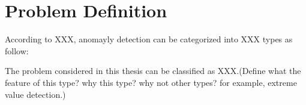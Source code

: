 \section{Problem Definition}
According to XXX, anomayly detection can be categorized into XXX types as follow:

The problem considered in this thesis can be classified as XXX.(Define what the feature of this type? why this type? why not other types? for example, extreme value detection.)

%
%
%
%
